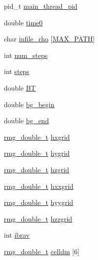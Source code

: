 \begin{DoxyCompactItemize}
\item 
pid\-\_\-t \hyperlink{struct_c_o_n_t_r_o_l_aa486f719299ef63193ff1098c210bdcf}{main\-\_\-thread\-\_\-pid}
\item 
double \hyperlink{struct_c_o_n_t_r_o_l_a2a6ddfb272f64ecd13758e08c09173f6}{time0}
\item 
char \hyperlink{struct_c_o_n_t_r_o_l_a9563b9953519b63bbace59b1a642ac68}{infile\-\_\-rho} \mbox{[}\hyperlink{_t_d_d_f_t_2_headers_2params_8h_ab99ded389af74001a6298fc9e44e74e5}{M\-A\-X\-\_\-\-P\-A\-T\-H}\mbox{]}
\item 
int \hyperlink{struct_c_o_n_t_r_o_l_adcfa1af7ba9d1f6085ded50ce6fe98bf}{num\-\_\-steps}
\item 
int \hyperlink{struct_c_o_n_t_r_o_l_a3f8a99e61dfe1be2a2cce25dced559a0}{steps}
\item 
double \hyperlink{struct_c_o_n_t_r_o_l_a384910d00fcc89ee6439ac37f1a8249f}{B\-T}
\item 
double \hyperlink{struct_c_o_n_t_r_o_l_a5d24a916fc837678e27c6afdafc3b020}{bg\-\_\-begin}
\item 
double \hyperlink{struct_c_o_n_t_r_o_l_a43583658d1d29dedb47a66a250a8a45c}{bg\-\_\-end}
\item 
\hyperlink{rmgtypes_8h_aaa16921c14f121c56eaa42390a340db8}{rmg\-\_\-double\-\_\-t} \hyperlink{struct_c_o_n_t_r_o_l_af26e7ed20a9d79368a174be7fe1d1aaf}{hxgrid}
\item 
\hyperlink{rmgtypes_8h_aaa16921c14f121c56eaa42390a340db8}{rmg\-\_\-double\-\_\-t} \hyperlink{struct_c_o_n_t_r_o_l_ae5901651ca55ef121154b2b76fdc49c3}{hygrid}
\item 
\hyperlink{rmgtypes_8h_aaa16921c14f121c56eaa42390a340db8}{rmg\-\_\-double\-\_\-t} \hyperlink{struct_c_o_n_t_r_o_l_a1f8634b07c97a491fccd17207e4911b1}{hzgrid}
\item 
\hyperlink{rmgtypes_8h_aaa16921c14f121c56eaa42390a340db8}{rmg\-\_\-double\-\_\-t} \hyperlink{struct_c_o_n_t_r_o_l_aa5b62df45765ffdad0015ff0b9bc32ac}{hxxgrid}
\item 
\hyperlink{rmgtypes_8h_aaa16921c14f121c56eaa42390a340db8}{rmg\-\_\-double\-\_\-t} \hyperlink{struct_c_o_n_t_r_o_l_a79ab5d0781664c74db81c8e2f1e61b1f}{hyygrid}
\item 
\hyperlink{rmgtypes_8h_aaa16921c14f121c56eaa42390a340db8}{rmg\-\_\-double\-\_\-t} \hyperlink{struct_c_o_n_t_r_o_l_a1cf71a70d87a64266bef7069b378cef2}{hzzgrid}
\item 
int \hyperlink{struct_c_o_n_t_r_o_l_ace994a5ce00484d6c8af73c01e085cf0}{ibrav}
\item 
\hyperlink{rmgtypes_8h_aaa16921c14f121c56eaa42390a340db8}{rmg\-\_\-double\-\_\-t} \hyperlink{struct_c_o_n_t_r_o_l_a01e6e29c4873d212e7b80f06d24bb7d0}{celldm} \mbox{[}6\mbox{]}

\end{DoxyCompactItemize}
